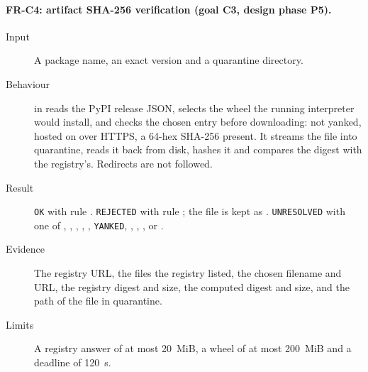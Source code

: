 \paragraph{FR-C4: artifact SHA-256 verification (goal C3, design phase P5).}
\begin{sloppypar}
\begin{description}
    \item[Input] A package name, an exact version and a quarantine directory.
    \item[Behaviour]  in  reads the PyPI release JSON, selects the wheel the running interpreter would install, and checks the chosen entry before downloading: not yanked, hosted on  over HTTPS, a 64-hex SHA-256 present. It streams the file into quarantine, reads it back from disk, hashes it and compares the digest with the registry's. Redirects are not followed.
    \item[Result] \texttt{OK} with rule . \texttt{REJECTED} with rule ; the file is kept as . \texttt{UNRESOLVED} with one of , , , , , \texttt{YANKED}, , , ,  or .
    \item[Evidence] The registry URL, the files the registry listed, the chosen filename and URL, the registry digest and size, the computed digest and size, and the path of the file in quarantine.
    \item[Limits] A registry answer of at most 20~MiB, a wheel of at most 200~MiB and a deadline of 120~s.
\end{description}
\end{sloppypar}

